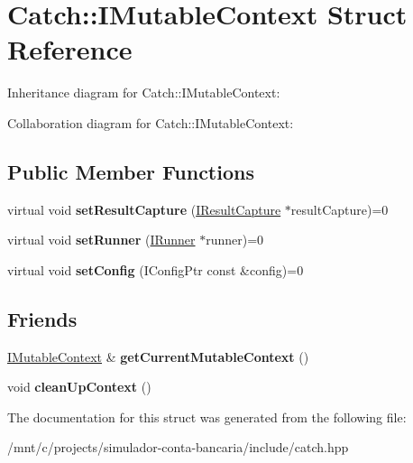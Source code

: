 \hypertarget{structCatch_1_1IMutableContext}{}\section{Catch\+:\+:I\+Mutable\+Context Struct Reference}
\label{structCatch_1_1IMutableContext}


Inheritance diagram for Catch\+:\+:I\+Mutable\+Context\+:


Collaboration diagram for Catch\+:\+:I\+Mutable\+Context\+:
\subsection*{Public Member Functions}
\begin{DoxyCompactItemize}
\item 
\mbox{\label{structCatch_1_1IMutableContext_a4a80afd0525b7def21bee8d9b48f2d39}} 
virtual void {\bfseries set\+Result\+Capture} (\hyperlink{structCatch_1_1IResultCapture}{I\+Result\+Capture} $\ast$result\+Capture)=0
\item 
\mbox{\label{structCatch_1_1IMutableContext_af2e53b1dea4527a2587cff266a730f6e}} 
virtual void {\bfseries set\+Runner} (\hyperlink{structCatch_1_1IRunner}{I\+Runner} $\ast$runner)=0
\item 
\mbox{\label{structCatch_1_1IMutableContext_aa81ba080fce084e9482f20338bc88531}} 
virtual void {\bfseries set\+Config} (I\+Config\+Ptr const \&config)=0
\end{DoxyCompactItemize}
\subsection*{Friends}
\begin{DoxyCompactItemize}
\item 
\mbox{\label{structCatch_1_1IMutableContext_aea4b25692aaf4397cdf630716976f6b8}} 
\hyperlink{structCatch_1_1IMutableContext}{I\+Mutable\+Context} \& {\bfseries get\+Current\+Mutable\+Context} ()
\item 
\mbox{\label{structCatch_1_1IMutableContext_ac07cdb7d744cc8f09672d924324b55fd}} 
void {\bfseries clean\+Up\+Context} ()
\end{DoxyCompactItemize}


The documentation for this struct was generated from the following file\+:\begin{DoxyCompactItemize}
\item 
/mnt/c/projects/simulador-\/conta-\/bancaria/include/catch.\+hpp\end{DoxyCompactItemize}
